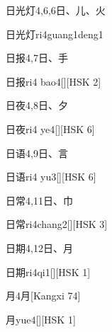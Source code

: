 \begin{Entry}{日光灯}{4,6,6}{⽇、⼉、⽕}
  \begin{Phonetics}{日光灯}{ri4guang1deng1}
  \end{Phonetics}
\end{Entry}

\begin{Entry}{日报}{4,7}{⽇、⼿}
  \begin{Phonetics}{日报}{ri4 bao4}[][HSK 2]
  \end{Phonetics}
\end{Entry}

\begin{Entry}{日夜}{4,8}{⽇、⼣}
  \begin{Phonetics}{日夜}{ri4 ye4}[][HSK 6]
  \end{Phonetics}
\end{Entry}

\begin{Entry}{日语}{4,9}{⽇、⾔}
  \begin{Phonetics}{日语}{ri4 yu3}[][HSK 6]
  \end{Phonetics}
\end{Entry}

\begin{Entry}{日常}{4,11}{⽇、⼱}
  \begin{Phonetics}{日常}{ri4chang2}[][HSK 3]
  \end{Phonetics}
\end{Entry}

\begin{Entry}{日期}{4,12}{⽇、⽉}
  \begin{Phonetics}{日期}{ri4qi1}[][HSK 1]
  \end{Phonetics}
\end{Entry}

\begin{Entry}{月}{4}{⽉}[Kangxi 74]
  \begin{Phonetics}{月}{yue4}[][HSK 1]
  \end{Phonetics}
\end{Entry}

